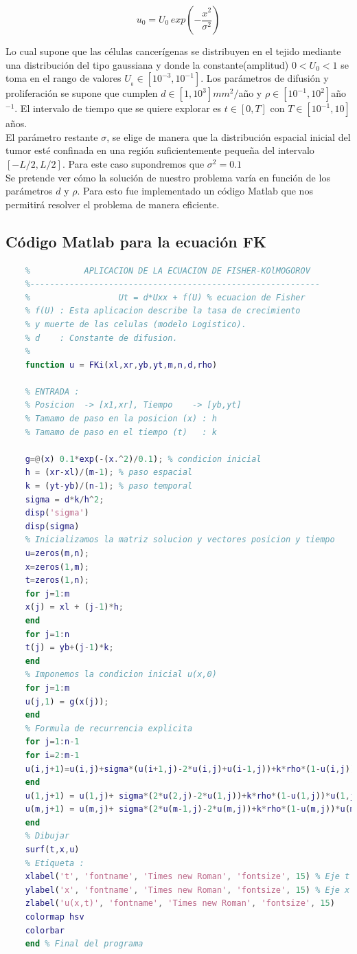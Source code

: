 $$u_{0}=U_{0}\,exp\left(-\dfrac{x^2}{\sigma^2}\right)$$

Lo cual supone que las células cancerígenas se distribuyen en el tejido mediante una distribución del tipo gaussiana y donde la constante(amplitud) $0<U_0<1$ se toma en el rango de valores $U_{_{0}}\in[10^{-3},10^{-1}]$. Los parámetros de difusión y proliferación se supone que cumplen $d\in[1,10^{3}]mm^{2}/$año y $\rho\in[10^{-1},10^{2}]$año$^{-1}$. El intervalo de tiempo que se quiere explorar es $t\in[0,T]$ con $T\in[10^{-1},10]$años.\\

El parámetro restante $\sigma$, se elige de manera que la distribución espacial inicial del tumor esté confinada en una región suficientemente pequeña del intervalo $[-L/2,L/2]$. Para este caso supondremos que $\sigma^2=0\mbox{.}1$\\

Se pretende ver cómo la solución de nuestro problema varía en función de los parámetros $d$ y $\rho$. Para esto fue implementado un código Matlab que nos permitirá resolver el problema de manera eficiente.

\subsection{Código Matlab para la ecuación FK}
\begin{lstlisting}[language=matlab]
	%-----------------------------------------------------------
	%           APLICACION DE LA ECUACION DE FISHER-KOlMOGOROV
	%-----------------------------------------------------------
	%                  Ut = d*Uxx + f(U) % ecuacion de Fisher
	% f(U) : Esta aplicacion describe la tasa de crecimiento 
	% y muerte de las celulas (modelo Logistico). 
	% d    : Constante de difusion.
	%
	function u = FKi(xl,xr,yb,yt,m,n,d,rho)
	
	% ENTRADA : 
	% Posicion  -> [x1,xr], Tiempo    -> [yb,yt]
	% Tamamo de paso en la posicion (x) : h
	% Tamamo de paso en el tiempo (t)   : k
	
	g=@(x) 0.1*exp(-(x.^2)/0.1); % condicion inicial
	h = (xr-xl)/(m-1); % paso espacial 
	k = (yt-yb)/(n-1); % paso temporal
	sigma = d*k/h^2;
	disp('sigma')
	disp(sigma)
	% Inicializamos la matriz solucion y vectores posicion y tiempo
	u=zeros(m,n);
	x=zeros(1,m);
	t=zeros(1,n);
	for j=1:m
	x(j) = xl + (j-1)*h;
	end
	for j=1:n
	t(j) = yb+(j-1)*k;
	end
	% Imponemos la condicion inicial u(x,0)
	for j=1:m
	u(j,1) = g(x(j));
	end
	% Formula de recurrencia explicita
	for j=1:n-1
	for i=2:m-1
	u(i,j+1)=u(i,j)+sigma*(u(i+1,j)-2*u(i,j)+u(i-1,j))+k*rho*(1-u(i,j))*u(i,j);
	end
	u(1,j+1) = u(1,j)+ sigma*(2*u(2,j)-2*u(1,j))+k*rho*(1-u(1,j))*u(1,j);
	u(m,j+1) = u(m,j)+ sigma*(2*u(m-1,j)-2*u(m,j))+k*rho*(1-u(m,j))*u(m,j);
	end
	% Dibujar
	surf(t,x,u)
	% Etiqueta :
	xlabel('t', 'fontname', 'Times new Roman', 'fontsize', 15) % Eje t
	ylabel('x', 'fontname', 'Times new Roman', 'fontsize', 15) % Eje x
	zlabel('u(x,t)', 'fontname', 'Times new Roman', 'fontsize', 15)
	colormap hsv
	colorbar
	end % Final del programa
\end{lstlisting}

